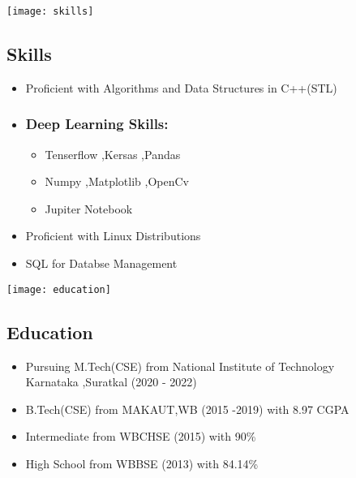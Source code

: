 \documentclass[12pt]{article}
\begin{document}
\begin{figure}[!hbt]

\begin{minipage}{0.40\textwidth}
\vspace*{-0.0in}
\texttt{[image: skills]}
\vspace{-0.25in}
\subsection*{Skills}
\begin{itemize}
\item
Proficient with Algorithms and Data Structures in C++(STL)
\item
\subsubsection*{Deep Learning Skills:}
\begin{itemize}
\item
Tenserflow ,Kersas ,Pandas
\item
Numpy ,Matplotlib ,OpenCv
\item
Jupiter Notebook  
\end{itemize}
\item
Proficient with Linux Distributions 
\item
SQL for Databse Management 

\end{itemize}
\end{minipage}
\hfill
\begin{minipage}{0.54\textwidth}
\vspace*{-0.8in}
\texttt{[image: education]}
\vspace{-0.25in}

\subsection*{Education}
\begin{itemize}
\item
Pursuing M.Tech(CSE) from National Institute of Technology Karnataka ,Suratkal  (2020 - 2022)
\item
B.Tech(CSE) from MAKAUT,WB (2015 -2019) with 8.97 CGPA
\item
Intermediate from  WBCHSE (2015) with 90\%
\item
High School from WBBSE (2013) with 84.14\%
\end{itemize}

\end{minipage}

\end{figure}
\end{document}
